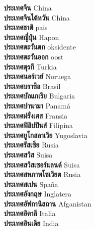 \textbf{ ประเทศจีน  } China \\
\textbf{ ประเทศจีนไต้หวัน  } China \\
\textbf{ ประเทศชาติ  } pais \\
\textbf{ ประเทศญี่ปุ่น  } Hapon \\
\textbf{ ประเทศตะวันตก  } oksidente \\
\textbf{ ประเทศตะวันออก  } oost \\
\textbf{ ประเทศตุรกี  } Turkia \\
\textbf{ ประเทศนอร์เวย์  } Noruega \\
\textbf{ ประเทศบราซิล  } Brasil \\
\textbf{ ประเทศบัลแกเรีย  } Bulgaria \\
\textbf{ ประเทศปานามา  } Panamá \\
\textbf{ ประเทศฝรั่งเศส  } Fransia \\
\textbf{ ประเทศฟิลิปปินส์  } Filipina \\
\textbf{ ประเทศยูโกสลาเวีย  } Yugoslavia \\
\textbf{ ประเทศรัสเซีย  } Rusia \\
\textbf{ ประเทศสวิส  } Suisa \\
\textbf{ ประเทศสวิสเซอร์แลนด์  } Suisa \\
\textbf{ ประเทศสหภาพโซเวียต  } Rusia \\
\textbf{ ประเทศสเปน  } Spaña \\
\textbf{ ประเทศอังกฤษ  } Inglatera \\
\textbf{ ประเทศอัฟกานิสถาน  } Afganistan \\
\textbf{ ประเทศอิตาลี  } Italia \\
\textbf{ ประเทศอินเดีย  } India \\

